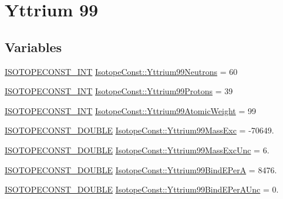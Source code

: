 \hypertarget{group___isotope_const-_yttrium-_y99}{}\section{Yttrium 99}
\label{group___isotope_const-_yttrium-_y99}
\subsection*{Variables}
\begin{DoxyCompactItemize}
\item 
\mbox{\hyperlink{group___isotope_const-_macros_ga5f18360b3e99483a35c32d789e62621c}{I\+S\+O\+T\+O\+P\+E\+C\+O\+N\+S\+T\+\_\+\+I\+NT}} \mbox{\hyperlink{group___isotope_const-_yttrium-_y99_ga1db60c859fce798418a26dc3fbc797d9}{Isotope\+Const\+::\+Yttrium99\+Neutrons}} = 60
\item 
\mbox{\hyperlink{group___isotope_const-_macros_ga5f18360b3e99483a35c32d789e62621c}{I\+S\+O\+T\+O\+P\+E\+C\+O\+N\+S\+T\+\_\+\+I\+NT}} \mbox{\hyperlink{group___isotope_const-_yttrium-_y99_gaf5db05f09ac489392ff6f848de5badaa}{Isotope\+Const\+::\+Yttrium99\+Protons}} = 39
\item 
\mbox{\hyperlink{group___isotope_const-_macros_ga5f18360b3e99483a35c32d789e62621c}{I\+S\+O\+T\+O\+P\+E\+C\+O\+N\+S\+T\+\_\+\+I\+NT}} \mbox{\hyperlink{group___isotope_const-_yttrium-_y99_ga3501f6f920fd99f72bdd371024e01d3d}{Isotope\+Const\+::\+Yttrium99\+Atomic\+Weight}} = 99
\item 
\mbox{\hyperlink{group___isotope_const-_macros_ga8f45a7272ce02c0b4c65c44636ed719a}{I\+S\+O\+T\+O\+P\+E\+C\+O\+N\+S\+T\+\_\+\+D\+O\+U\+B\+LE}} \mbox{\hyperlink{group___isotope_const-_yttrium-_y99_ga40c9dee9c59330f78166eed23346b194}{Isotope\+Const\+::\+Yttrium99\+Mass\+Exc}} = -\/70649.
\item 
\mbox{\hyperlink{group___isotope_const-_macros_ga8f45a7272ce02c0b4c65c44636ed719a}{I\+S\+O\+T\+O\+P\+E\+C\+O\+N\+S\+T\+\_\+\+D\+O\+U\+B\+LE}} \mbox{\hyperlink{group___isotope_const-_yttrium-_y99_ga27ef3e7a435e00d8823f429491b48937}{Isotope\+Const\+::\+Yttrium99\+Mass\+Exc\+Unc}} = 6.
\item 
\mbox{\hyperlink{group___isotope_const-_macros_ga8f45a7272ce02c0b4c65c44636ed719a}{I\+S\+O\+T\+O\+P\+E\+C\+O\+N\+S\+T\+\_\+\+D\+O\+U\+B\+LE}} \mbox{\hyperlink{group___isotope_const-_yttrium-_y99_gad63e3b180cff8841844f3b33e217dda1}{Isotope\+Const\+::\+Yttrium99\+Bind\+E\+PerA}} = 8476.
\item 
\mbox{\hyperlink{group___isotope_const-_macros_ga8f45a7272ce02c0b4c65c44636ed719a}{I\+S\+O\+T\+O\+P\+E\+C\+O\+N\+S\+T\+\_\+\+D\+O\+U\+B\+LE}} \mbox{\hyperlink{group___isotope_const-_yttrium-_y99_ga0aa6ff821864a3eae61a769db55548e3}{Isotope\+Const\+::\+Yttrium99\+Bind\+E\+Per\+A\+Unc}} = 0.

\end{DoxyCompactItemize}
